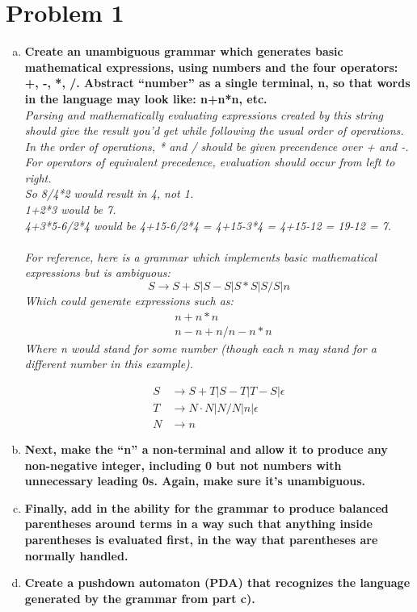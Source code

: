 \documentclass[12pt]{scrbook}
\begin{document}
\section*{Problem 1}
\begin{enumerate}[a.]
  \item \textbf{Create an unambiguous grammar which generates basic
  mathematical expressions, using numbers and the four operators: +, -, *, /.
  Abstract ``number'' as a single terminal, n, so that words in the language may
  look like: n+n*n, etc.}
  \\
\emph{Parsing and mathematically evaluating expressions created by this string
  should give the result you'd get while following the usual order of
  operations. In the order of operations, * and / should be given precendence
  over + and -. For operators of equivalent precedence, evaluation should occur
  from left to right.\\
So 8/4*2 would result in 4, not 1.\\
1+2*3 would be 7.\\
4+3*5-6/2*4 would be 4+15-6/2*4 = 4+15-3*4 =  4+15-12 = 19-12 = 7.\\
\\
For reference, here is a grammar which implements basic mathematical
expressions but is ambiguous:\\
\[ S \rightarrow S+S | S-S | S*S | S/S | n \]
Which could generate expressions such as:\\
\begin{align*}
&n+n*n\\
&n-n+n/n-n*n
\end{align*}
Where n would stand for some number (though each n may stand for a different
number in this example).}

\par

\begin{align*}
  S &\rightarrow S + T | S - T | T - S | \epsilon \\
  T &\rightarrow N \cdot N | N / N | n | \epsilon\\
  N &\rightarrow n
\end{align*}
\item \textbf{Next, make the ``n'' a non-terminal and allow it to produce any
  non-negative integer, including 0 but not numbers with unnecessary leading
0s. Again, make sure it's unambiguous.}
  \item \textbf{Finally, add in the ability for the grammar to
    produce balanced parentheses around terms in a way such that
    anything inside parentheses is evaluated first, in the way that
    parentheses are normally handled.}
  \item \textbf{Create a pushdown automaton (PDA) that recognizes the language
  generated by the grammar from part c).}

\end{enumerate}
\end{document}
